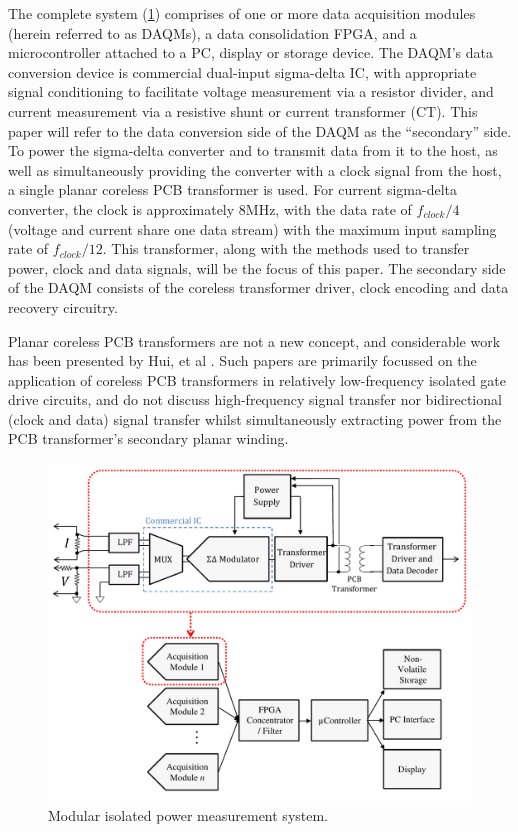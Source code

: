 \documentclass[conference]{IEEEtran}
\begin{document}
The complete system (\ref{fig:FullSystem}) comprises of one or more data acquisition modules (herein referred to as DAQMs), a data consolidation FPGA, and a microcontroller attached to a PC, display or storage device.  
The DAQM's data conversion device is commercial dual-input sigma-delta IC, with appropriate signal conditioning to facilitate voltage measurement via a resistor divider, and current measurement via a resistive shunt or current transformer (CT).  This paper will refer to the data conversion side of the DAQM as the ``secondary'' side.  To power the sigma-delta converter and to transmit data from it to the host, as well as simultaneously providing the converter with a clock signal from the host, a single planar coreless PCB transformer is used.  For current sigma-delta converter, the clock is approximately 8MHz, with the data rate of $ f_{clock}/4 $ (voltage and current share one data stream) with the maximum input sampling rate of $ f_{clock}/12 $.
This transformer, along with the methods used to transfer power, clock and data signals, will be the focus of this paper.  The secondary side of the DAQM consists of the coreless transformer driver, clock encoding and data recovery circuitry.  

Planar coreless PCB transformers are not a new concept, and considerable work has been presented by Hui, et al \cite{TangHuiFundamental}.  Such papers are primarily focussed on the application of coreless PCB transformers in relatively low-frequency isolated gate drive circuits, and do not discuss high-frequency signal transfer nor bidirectional (clock and data) signal transfer whilst simultaneously extracting power from the PCB transformer's secondary planar winding.

\begin{figure}[t]
	\centering
	\includegraphics[width=1\columnwidth]{./img/FullSystem_BasicCol}
	\caption{Modular isolated power measurement system.}
	\label{fig:FullSystem}
\end{figure}
\end{document}
